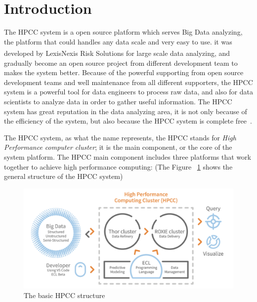 \section{Introduction}
The HPCC system is a open source platform which serves Big Data analyzing, the platform that could handles any data scale and very easy to use. it was developed by LexisNexis\textsuperscript{\textregistered} Risk Solutions for large scale data analyzing, and gradually become an open source project from different development team to makes the system better. Because of the powerful supporting from open source development teams and well maintenance from all different supporters, the HPCC system is a powerful tool for data engineers to process raw data, and also for data scientists to analyze data in order to gather useful information. The HPCC system has great reputation in the data analyzing area, it is not only because of the efficiency of the system, but also because the HPCC system is complete free~\cite{Intro1}.

The HPCC system, as what the name represents, the HPCC stands for \textit{High Performance computer cluster}; it is the main component, or the core of the system platform. The HPCC main component includes three platforms that work together to achieve high performance computing: (The Figure ~\ref{f:hpcc} shows the general structure of the HPCC system)

\begin{figure}[!ht]
\centering\includegraphics[width=\columnwidth]{images/hpcc.png}
\caption{The basic HPCC structure}\label{f:hpcc}
\end{figure}

